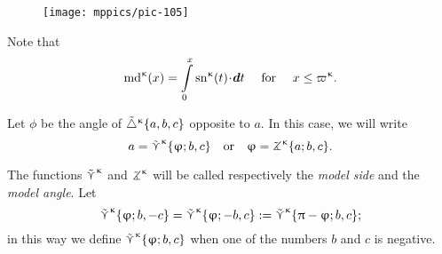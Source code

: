 {

\begin{wrapfigure}{r}{44mm}
\centering
\texttt{[image: mppics/pic-105]}
\end{wrapfigure}


Note that
\[
\mdk(x)=\int\limits_0^x
\snk(t)\cdot\dd t \quad \text{ for }\quad x\le \varpi\kappa.
\]

Let $\phi$ be the angle of ${\tilde\triangle}^{\upkappa}\{a,b,c\}$  
opposite to $a$.
In this case, we will write \label{page:model-side}
\[a
=
\side\kappa\{\phi;b,c\}
\quad  \text{or}\quad 
\phi
=
\tangle\mc\kappa\{a;b,c\}.\]

}

The functions $\mathop{\tilde\curlyvee}\nolimits^{\upkappa}$ and $\tangle\mc\kappa$ will be called respectively the \emph{model side} and the \emph{model angle}.
Let 
\[
\mathop{\tilde\curlyvee}\nolimits^{\upkappa}\{\upvarphi;b,-c\}
=\mathop{\tilde\curlyvee}\nolimits^{\upkappa}\{\upvarphi;-b,c\}
:=\mathop{\tilde\curlyvee}\nolimits^{\upkappa}\{\uppi-\upvarphi;b,c\};\]
in this way we define $\mathop{\tilde\curlyvee}\nolimits^{\upkappa}\{\upvarphi;b,c\}$ when one of the numbers  $b$ and $c$ is negative. %


